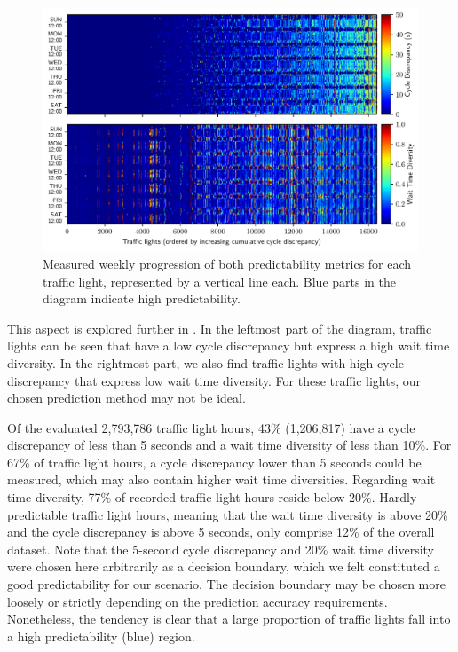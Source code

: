 \begin{figure}[!t]
    \centering
    \includegraphics[width=\linewidth]{images/predictability-week-heatmap-per-thing.pdf}
    \caption{Measured weekly progression of both predictability metrics for each traffic light, represented by a vertical line each. Blue parts in the diagram indicate high predictability.}\label{fig:predictability-week-heatmap-per-thing}
\end{figure}

This aspect is explored further in . In the leftmost part of the diagram, traffic lights can be seen that have a low cycle discrepancy but express a high wait time diversity. In the rightmost part, we also find traffic lights with high cycle discrepancy that express low wait time diversity. For these traffic lights, our chosen prediction method may not be ideal. 

Of the evaluated 2,793,786 traffic light hours, 43\% (1,206,817) have a cycle discrepancy of less than 5 seconds and a wait time diversity of less than 10\%. For 67\% of traffic light hours, a cycle discrepancy lower than 5 seconds could be measured, which may also contain higher wait time diversities. Regarding wait time diversity, 77\% of recorded traffic light hours reside below 20\%. Hardly predictable traffic light hours, meaning that the wait time diversity is above 20\% and the cycle discrepancy is above 5 seconds, only comprise 12\% of the overall dataset. Note that the 5-second cycle discrepancy and 20\% wait time diversity were chosen here arbitrarily as a decision boundary, which we felt constituted a good predictability for our scenario. The decision boundary may be chosen more loosely or strictly depending on the prediction accuracy requirements. Nonetheless, the tendency is clear that a large proportion of traffic lights fall into a high predictability (blue) region. 

